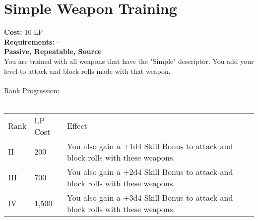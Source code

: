 \section{Simple Weapon Training}\label{perk:simpleWeaponTraining}
\textbf{Cost:} 10 LP\\
\textbf{Requirements:} -\\
\textbf{Passive, Repeatable, Source}\\
You are trained with all weapons that have the "Simple" descriptor.
You add your level to attack and block rolls made with that weapon.\\
\\
Rank Progression:\\
\\
\begin{longtable}{l | l | p{9cm}}
	Rank & LP Cost &  Effect\\
	II & 200 & You also gain a +1d4 Skill Bonus to attack and block rolls with these weapons.\\
	III & 700 & You also gain a +2d4 Skill Bonus to attack and block rolls with these weapons.\\
	IV & 1,500 & You also gain a +3d4 Skill Bonus to attack and block rolls with these weapons.\\
\end{longtable}